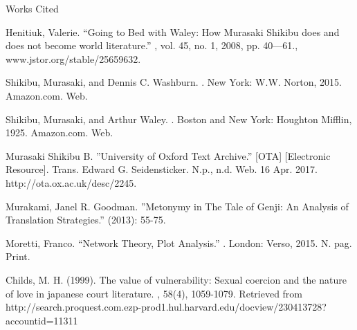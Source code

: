 \documentclass[12pt]{article}
\newcommand{\bibent}{\noindent \hangindent 40pt}
\newenvironment{workscited}{\newpage \begin{center} Works Cited \end{center}}{\newpage }
\begin{document}
\begin{flushleft}
\begin{spacing}{2.0}
\begin{workscited}
\bibent Henitiuk, Valerie. ``Going to Bed with Waley: How Murasaki Shikibu does and does not become world literature.'' , vol. 45, no. 1, 2008, pp. 40---61., www.jstor.org/stable/25659632.

\bibent Shikibu, Murasaki, and Dennis C. Washburn. . New York: W.W. Norton, 2015. Amazon.com. Web.

\bibent Shikibu, Murasaki, and Arthur Waley. . Boston and New York: Houghton Mifflin, 1925. Amazon.com. Web.

\bibent Murasaki Shikibu B. ''University of Oxford Text Archive.'' [OTA]  [Electronic Resource]. Trans. Edward G. Seidensticker. N.p., n.d. Web. 16 Apr. 2017. http://ota.ox.ac.uk/desc/2245.

\bibent Murakami, Janel R. Goodman. ''Metonymy in The Tale of Genji: An Analysis of Translation Strategies.''  (2013): 55-75.

\bibent Moretti, Franco. ``Network Theory, Plot Analysis.'' . London: Verso, 2015. N. pag. Print.

\bibent Childs, M. H. (1999). The value of vulnerability: Sexual coercion and the nature of love in japanese court literature. , 58(4), 1059-1079. Retrieved from http://search.proquest.com.ezp-prod1.hul.harvard.edu/docview/230413728?accountid=11311
\end{workscited}


\end{spacing}
\end{flushleft}
\end{document}
